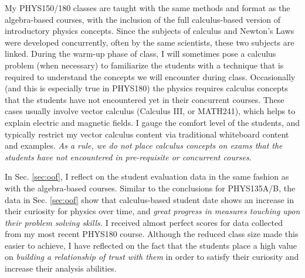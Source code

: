 \documentclass[../../../main.tex]{subfiles}
\begin{document}
My PHYS150/180 classes are taught with the same methods and format as the algebra-based courses, with the inclusion of the full calculus-based version of introductory physics concepts.  Since the subjects of calculus and Newton's Laws were developed concurrently, often by the same scientists, these two subjects are linked.  During the warm-up phase of class, I will sometimes pose a calculus problem (when necessary) to familiarize the students with a technique that is required to understand the concepts we will encounter during class.  Occasionally (and this is especially true in PHYS180) the physics requires calculus concepts that the students have not encountered yet in their concurrent courses.  These cases usually involve vector calculus (Calculus III, or MATH241), which helps to explain electric and magnetic fields.  I gauge the comfort level of the students, and typically restrict my vector calculus content via traditional whiteboard content and examples.  \textit{As a rule, we do not place calculus concepts on exams that the students have not encountered in pre-requisite or concurrent courses}.  \\ \hspace{0.1cm}

In Sec. \ref{sec:oof}, I reflect on the student evaluation data in the same fashion as with the algebra-based courses.  Similar to the conclusions for PHYS135A/B, the data in Sec. \ref{sec:oof} show that calculus-based student date shows an increase in their curiosity for physics over time, and \textit{great progress in measures touching upon their problem solving skills.}  I received almost perfect scores for data collected from my most recent PHYS180 course.  Although the reduced class size made this easier to achieve, I have reflected on the fact that the students place a high value on \textit{building a relationship of trust with them} in order to satisfy their curiosity and increase their analysis abilities. %

\end{document}
